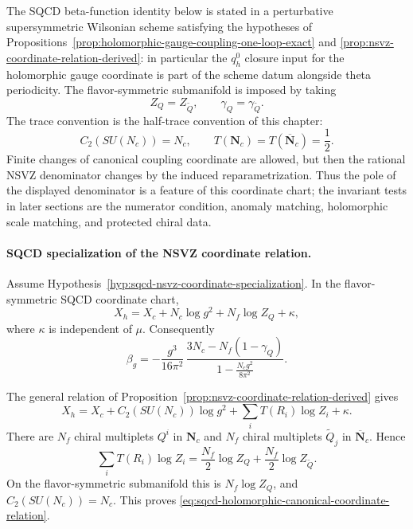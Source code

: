 \begin{hypothesis}
\label{hyp:sqcd-nsvz-coordinate-specialization}
The SQCD beta-function identity below is stated in a perturbative
supersymmetric Wilsonian scheme satisfying the hypotheses of
Propositions~\ref{prop:holomorphic-gauge-coupling-one-loop-exact} and
\ref{prop:nsvz-coordinate-relation-derived}: in particular the \(q_h^0\)
closure input for the holomorphic gauge coordinate is part of the scheme
datum alongside theta periodicity.  The
flavor-symmetric submanifold is imposed by taking
\[
  Z_Q=Z_{\widetilde Q},\qquad
  \gamma_Q=\gamma_{\widetilde Q}.
\]
The trace convention is the half-trace convention of this chapter:
\[
  C_2(SU(N_c))=N_c,\qquad
  T(\mathbf N_c)=T(\overline{\mathbf N}_c)=\frac12 .
\]
Finite changes of canonical coupling coordinate are allowed, but then the
rational NSVZ denominator changes by the induced reparametrization.  Thus
the pole of the displayed denominator is a feature of this coordinate chart;
the invariant tests in later sections are the numerator condition, anomaly
matching, holomorphic scale matching, and protected chiral data.
\end{hypothesis}

\paragraph{SQCD specialization of the NSVZ coordinate relation.}
Assume Hypothesis~\ref{hyp:sqcd-nsvz-coordinate-specialization}.  In the
flavor-symmetric SQCD coordinate chart,
\begin{equation}
  X_h
  =
  X_c+N_c\log g^2+N_f\log Z_Q+\kappa ,
  \label{eq:sqcd-holomorphic-canonical-coordinate-relation}
\end{equation}
where \(\kappa\) is independent of \(\mu\).  Consequently
\begin{equation}
  \beta_g
  =
  -\frac{g^3}{16\pi^2}\,
  \frac{
    3N_c-N_f(1-\gamma_Q)
  }{
    1-\frac{N_cg^2}{8\pi^2}
  } .
  \label{eq:sqcd-nsvz-beta-specialized}
\end{equation}

The general relation of
Proposition~\ref{prop:nsvz-coordinate-relation-derived} gives
\[
  X_h
  =
  X_c+C_2(SU(N_c))\log g^2
  +
  \sum_i T(R_i)\log Z_i+\kappa .
\]
There are \(N_f\) chiral multiplets \(Q^i\) in \(\mathbf N_c\) and \(N_f\)
chiral multiplets \(\widetilde Q_j\) in \(\overline{\mathbf N}_c\).  Hence
\[
  \sum_iT(R_i)\log Z_i
  =
  \frac{N_f}{2}\log Z_Q+\frac{N_f}{2}\log Z_{\widetilde Q}.
\]
On the flavor-symmetric submanifold this is \(N_f\log Z_Q\), and
\(C_2(SU(N_c))=N_c\).  This proves
\eqref{eq:sqcd-holomorphic-canonical-coordinate-relation}.

